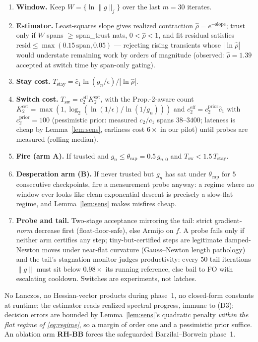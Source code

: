 ﻿\documentclass[10pt]{article}
\newcommand{\gnorm}{\lVert g\rVert}
\begin{document}
\begin{enumerate}\itemsep2pt
\item \textbf{Window.} Keep $W=\{\ln\gnorm_j\}$ over the last $m=30$
iterates.
\item \textbf{Estimator.} Least-squares slope gives realized contraction
$\hat\rho=e^{-\text{slope}}$; trust only if $W$ spans
$\ge\,$span\_trust nats, $0<\hat\rho<1$, and fit residual satisfies
$\mathrm{resid}\le\max(0.15\,\mathrm{span},0.05)$ --- rejecting rising
transients whose $|\ln\hat\rho|$ would understate remaining work by
orders of magnitude (observed: $\hat\rho=1.39$ accepted at switch time
by span-only gating).
\item \textbf{Stay cost.} $T_{\mathrm{stay}}
=\hat c_1\ln(g_n/\epsilon)/|\ln\hat\rho|$.
\item \textbf{Switch cost.} $T_{\mathrm{sw}}=c_2^{\mathrm{eff}}K_2^{\mathrm{est}}$,
with the Prop.-2-aware count
$K_2^{\mathrm{est}}=\max(1,\log_2(\ln(1/\epsilon)/\ln(1/g_n)))$ and
$c_2^{\mathrm{eff}}=c_2^{\mathrm{prior}}\hat c_1$ with
$c_2^{\mathrm{prior}}=100$ (pessimistic prior: measured $c_2/c_1$ spans
$38$--$3400$; lateness is cheap by Lemma~\ref{lem:sens}, earliness cost
$6\times$ in our pilot) until probes are measured (rolling median).
\item \textbf{Fire (arm A).} If trusted and
$g_n\le\theta_{\mathrm{cap}}=0.5\,g_{n,0}$ and
$T_{\mathrm{sw}}<1.5\,T_{\mathrm{stay}}$.
\item \textbf{Desperation arm (B).} If never trusted but $g_n$ has sat
under $\theta_{\mathrm{cap}}$ for $5$ consecutive checkpoints, fire a
measurement probe anyway: a regime where no window ever looks like
clean exponential descent is precisely a slow-flat regime, and
Lemma~\ref{lem:sens} makes misfires cheap.
\item \textbf{Probe and tail.} Two-stage acceptance mirroring the tail:
strict gradient-\emph{norm} decrease first (float-floor-safe), else
Armijo on $f$. A probe fails only if neither arm certifies any step;
tiny-but-certified steps are legitimate damped-Newton moves under
near-flat curvature (Gauss--Newton length pathology) and the tail's
stagnation monitor judges productivity: every $50$ tail iterations
$\gnorm$ must sit below $0.98\times$ its running reference, else bail
to FO with escalating cooldown. Switches are experiments, not latches.
\end{enumerate}

No Lanczos, no Hessian-vector products during phase~1, no closed-form
constants at runtime; the estimator reads realized spectral progress,
immune to (D3); decision errors are bounded by Lemma~\ref{lem:sens}'s
quadratic penalty \emph{within the flat regime of
\eqref{eq:regime}}, so a margin of order one and a pessimistic prior
suffice. An ablation arm \textbf{RH-BB} forces the safeguarded
Barzilai--Borwein phase~1.
\end{document}
